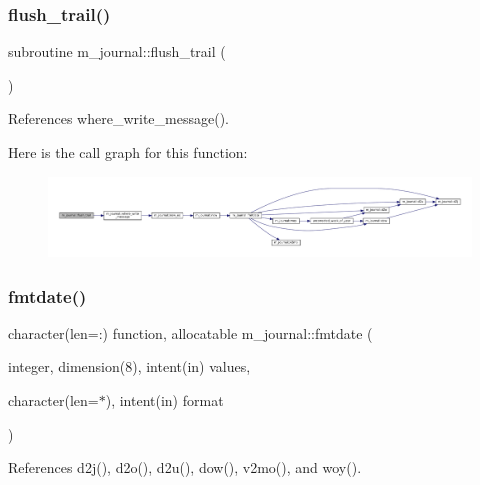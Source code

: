 \subsubsection{\texorpdfstring{flush\+\_\+trail()}{flush\_trail()}}
{\footnotesize\ttfamily subroutine m\+\_\+journal\+::flush\+\_\+trail (\begin{DoxyParamCaption}{ }\end{DoxyParamCaption})\hspace{0.3cm}{\ttfamily [private]}}



References where\+\_\+write\+\_\+message().

Here is the call graph for this function\+:\nopagebreak
\begin{figure}[H]
\begin{center}
\leavevmode
\includegraphics[width=350pt]{namespacem__journal_a24b891eded8ca585a6a72ab0eef7016c_cgraph}
\end{center}
\end{figure}
\mbox{\label{namespacem__journal_a626580cd351557ac2d107fd2a97a388f}} 
\subsubsection{\texorpdfstring{fmtdate()}{fmtdate()}}
{\footnotesize\ttfamily character(len=\+:) function, allocatable m\+\_\+journal\+::fmtdate (\begin{DoxyParamCaption}\item[{integer, dimension(8), intent(in)}]{values,  }\item[{character(len=$\ast$), intent(in)}]{format }\end{DoxyParamCaption})\hspace{0.3cm}{\ttfamily [private]}}



References d2j(), d2o(), d2u(), dow(), v2mo(), and woy().

